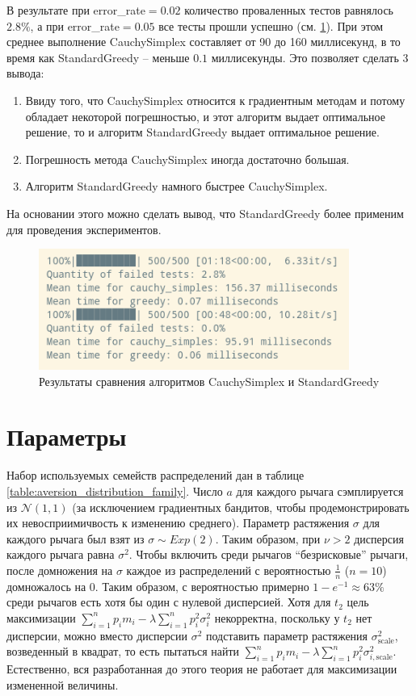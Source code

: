 В результате при error\_rate$=0.02$ количество проваленных тестов равнялось $2.8\%$, а при error\_rate$=0.05$ все тесты прошли успешно (см. \ref{fig:comparison_standard_greedy_cauchy_simplex}). При этом среднее выполнение CauchySimplex составляет от 90 до 160 миллисекунд, в то время как StandardGreedy -- меньше $0.1$ миллисекунды. Это позволяет сделать 3 вывода:
\begin{enumerate}
    \item Ввиду того, что CauchySimplex относится к градиентным методам и потому обладает некоторой погрешностью, и этот алгоритм выдает оптимальное решение, то и алгоритм StandardGreedy выдает оптимальное решение.
    \item Погрешность метода CauchySimplex иногда достаточно большая.
    \item Алгоритм StandardGreedy намного быстрее CauchySimplex.
\end{enumerate}
На основании этого можно сделать вывод, что StandardGreedy более применим для проведения экспериментов.

\begin{figure}[ht!] %
\centering
\includegraphics[width=4in]{theory_tester/theory_images/results_compare.png}
\caption{Результаты сравнения алгоритмов CauchySimplex и StandardGreedy}
\label{fig:comparison_standard_greedy_cauchy_simplex}
\end{figure}

\section{Параметры}

Набор используемых семейств распределений дан в таблице \ref{table:aversion_distribution_family}. Число $a$ для каждого рычага сэмплируется из $\mathcal{N}(1,1)$ (за исключением градиентных бандитов, чтобы продемонстрировать их невосприимичвость к изменению среднего). Параметр растяжения $\sigma$ для каждого рычага был взят из $\sigma \sim Exp(2)$. Таким образом, при $\nu > 2$ дисперсия каждого рычага равна $\sigma^2$. Чтобы включить среди рычагов ``безрисковые'' рычаги, после домножения на $\sigma$ каждое из распределений с вероятностью $\frac{1}{n}$ ($n=10$) домножалось на 0. Таким образом, с вероятностью примерно $1 - e^{-1} \approx 63\%$ среди рычагов есть хотя бы один с нулевой дисперсией. Хотя для $t_2$ цель максимизации $\sum_{i=1}^n p_i m_i - \lambda \sum_{i=1}^n p_i^2 \sigma_i^2$ некорректна, поскольку у $t_2$ нет дисперсии, можно вместо дисперсии $\sigma^2$ подставить параметр растяжения $\sigma_{\text{scale}}^2$, возведенный в квадрат, то есть пытаться найти $\sum_{i=1}^n p_i m_i - \lambda \sum_{i=1}^n p_i^2 \sigma_{i, \text{scale}}^2$. Естественно, вся разработанная до этого теория не работает для максимизации измененной величины.


